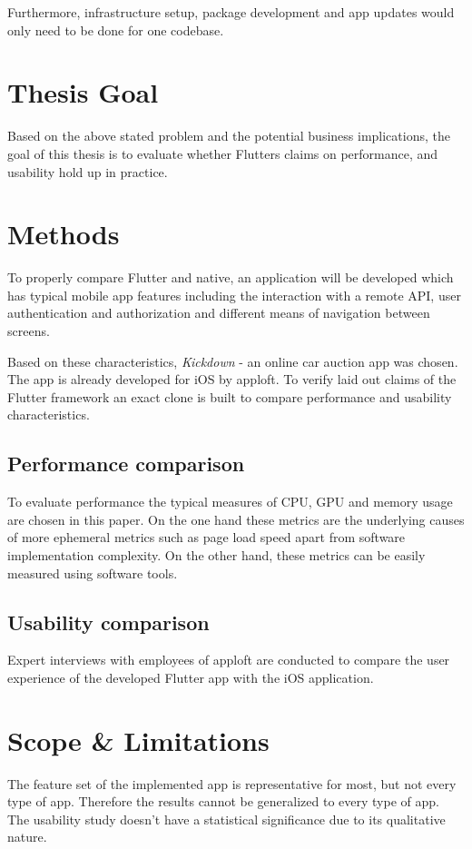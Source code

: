 Furthermore, infrastructure setup, package development and app updates would only need to be done for one codebase.

\section{Thesis Goal}
Based on the above stated problem and the potential business implications, the goal of this thesis is to evaluate 
whether Flutters claims on performance, and usability hold up in practice.

\section{Methods}
\label{section:methods}
To properly compare Flutter and native, an application will be developed which has typical mobile app features 
including the interaction with a remote API, user authentication and authorization and different means of navigation between screens.

Based on these characteristics, \textit{Kickdown} - an online car auction app was chosen. 
The app is already developed for iOS by apploft.
To verify laid out claims of the Flutter framework an exact clone is built to compare performance and usability characteristics.

\subsection{Performance comparison}
To evaluate performance the typical measures of CPU, GPU and memory usage are chosen in this paper. 
On the one hand these metrics are the underlying causes of more ephemeral metrics such as page load speed 
apart from software implementation complexity. On the other hand, these metrics can be easily measured using software tools.

\subsection{Usability comparison}
Expert interviews with employees of apploft are conducted to compare the user experience of the developed Flutter app with the iOS application.

\section{Scope \& Limitations}
The feature set of the implemented app is representative for most, but not every type of app. Therefore the results cannot be generalized to 
every type of app.
The usability study doesn't have a statistical significance due to its qualitative nature.



